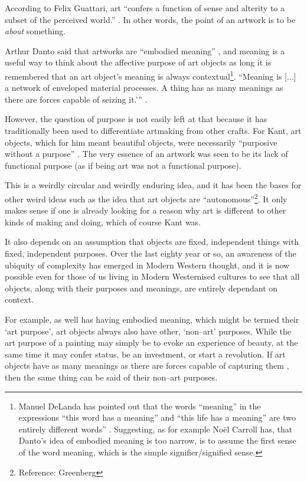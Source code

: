 \documentclass[letter:wpaper]{article}
\begin{document}
    According to Felix Guattari, art ``confers a function of sense and alterity to a subset of the perceived world.'' \citep[p.131]{GuattariChsmss1995}. In other words, the point of an artwork is to be \emph{about} something.
    
    Arthur Danto said that artworks are ``embodied meaning'' \citep[p.125]{DantoEmbdMnngs2007}, and meaning is a useful way to think about the affective purpose of art objects as long it is remembered that an art object's meaning is always contextual\footnote{
        Manuel DeLanda has pointed out that the words ``meaning'' in the expressions ``this word has a meaning'' and ``this life has a meaning'' are two entirely different words'' \citep[pp.40–41]{DeLandaCsltyAndMnng2018}. Suggesting, as for example Noël Carroll has, that Danto's idea of embodied meaning is too narrow, is to assume the first sense of the word meaning, which is the simple signifier/signified sense.
    }. ``Meaning is [...] a network of enveloped material processes. A thing has as many meanings as there are forces capable of seizing it.’'' \citep[p.10]{MassumiAUsrsGdTCptlsmAndSchzphrn1992}.

    However, the question of purpose is not easily left at that because it has traditionally been used to differentiate artmaking from other crafts. For Kant, art objects, which for him meant beautiful objects, were necessarily ``purposive without a purpose'' \citep[p.57]{KantCrtqOfJdgmnt}. The very essence of an artwork was seen to be its lack of functional purpose (as if being art was not a functional purpose).
    
    This is a weirdly circular and weirdly enduring idea, and it has been the bases for other weird ideas such as the idea that art objects are ``autonomous''\footnote{
        Reference: Greenberg
    }. It only makes sense if one is already looking for a reason why art is different to other kinds of making and doing, which of course Kant was.
    
    It also depends on an assumption that objects are fixed, independent things with fixed, independent purposes. Over the last eighty year or so, an awareness of the ubiquity of complexity has emerged in Modern Western thought, and it is now possible even for those of us living in Modern Westernised cultures to see that all objects, along with their purposes and meanings, are entirely dependant on context.

    For example, as well has having embodied meaning, which might be termed their ‘art purpose’, art objects always also have other, ‘non–art’ purposes. While the art purpose of a painting may simply be to evoke an experience of beauty, at the same time it may confer status, be an investment, or start a revolution. If art objects have as many meanings as there are forces capable of capturing them \citep[p.4]{DeleuzeNtschAndPhlsphy2006}, then the same thing can be said of their non–art purposes.
\end{document}
